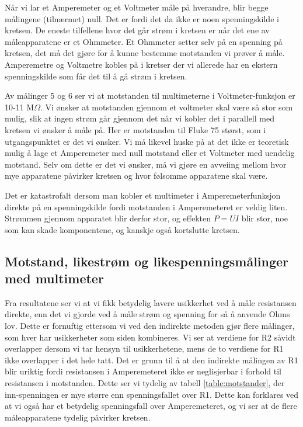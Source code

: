 \documentclass[reprint, english,notitlepage]{revtex4-1}  %
\begin{document}
Når vi lar et Amperemeter og et Voltmeter måle på hverandre, blir begge målingene (tilnærmet) null. Det er fordi det da ikke er noen spenningskilde i kretsen. De eneste tilfellene hvor det går strøm i kretsen er når det ene av måleapparatene er et Ohmmeter. Et Ohmmeter setter selv på en spenning på kretsen, det må det gjøre for å kunne bestemme motstanden vi prøver å måle. Amperemetre og Voltmetre kobles på i kretser der vi allerede har en ekstern spenningskilde som får det til å gå strøm i kretsen.

Av målinger 5 og 6 ser vi at motstanden til multimeterne i Voltmeter-funksjon er 10-11 M$\Omega$. Vi ønsker at motstanden gjennom et voltmeter skal være så stor som mulig, slik at ingen strøm går gjennom det når vi kobler det i parallell med kretsen vi ønsker å måle på. Her er motstanden til Fluke 75 størst, som i utgangspunktet er det vi ønsker. Vi må likevel huske på at det ikke er teoretisk mulig å lage et Amperemeter med null motstand eller et Voltmeter med uendelig motstand. Selv om dette er det vi ønsker, må vi gjøre en avveiing mellom hvor mye apparatene påvirker kretsen og hvor følsomme apparatene skal være.

Det er katastrofalt dersom man kobler et multimeter i Amperemeterfunksjon direkte på en spenningskilde fordi motstanden i Amperemeteret er veldig liten. Strømmen gjennom apparatet blir derfor stor, og effekten $P = U I$ blir stor, noe som kan skade komponentene, og kanskje også kortslutte kretsen.


\subsection{Motstand, likestrøm og likespenningsmålinger med multimeter}

Fra resultatene ser vi at vi fikk betydelig lavere usikkerhet ved å måle resistansen direkte, enn det vi gjorde ved å måle strøm og spenning for så å anvende Ohms lov. Dette er fornuftig ettersom vi ved den indirekte metoden gjør flere målinger, som hver har usikkerheter som siden kombineres. Vi ser at verdiene for R2 såvidt overlapper dersom vi tar hensyn til usikkerhetene, mens de to verdiene for R1 ikke overlapper i det hele tatt. Det er grunn til å at den indirekte målingen av R1 blir uriktig fordi resistansen i Amperemeteret ikke er neglisjerbar i forhold til resistansen i motstanden. Dette ser vi tydelig av tabell \ref{table:motstander}, der inn-spenningen er mye større enn spenningsfallet over R1. Dette kan forklares ved at vi også har et betydelig spenningsfall over Amperemeteret, og vi ser at de flere måleapparatene tydelig påvirker kretsen.
\end{document}
